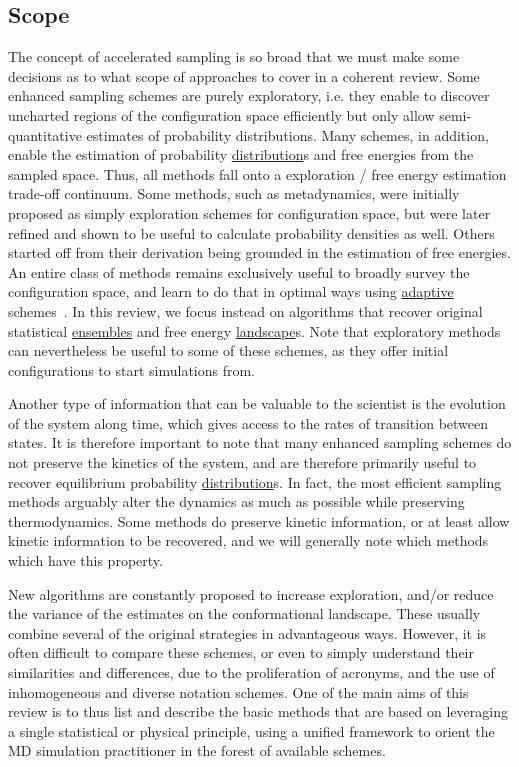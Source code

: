 \documentclass[9pt,review]{livecoms}
\begin{document}
\subsection{Scope}
The concept of accelerated sampling is so broad that we must make some decisions as to what scope of approaches to cover in a coherent review. 
Some enhanced sampling schemes are purely exploratory, i.e. they enable to discover uncharted regions of the configuration space efficiently but only allow semi-quantitative estimates of probability distributions. Many schemes, in addition, enable the estimation of probability \hyperlink{ref:Distribution} {distribution}s and free energies from the sampled space. Thus, all methods fall onto a exploration / free energy estimation trade-off continuum. Some methods, such as metadynamics, were initially proposed as simply exploration schemes for configuration space, but were later refined and shown to be useful to calculate probability densities as well.  Others started off from their derivation being grounded in the estimation of free energies. An entire class of methods remains exclusively useful to broadly survey the configuration space, and learn to do that in optimal ways using \hyperlink{ref:Adaptive} {adaptive} schemes~\cite{ChiavazzoE5494}. In this review, we focus instead on algorithms that recover original statistical \hyperlink{ref:Ensemble} {ensembles} and free energy \hyperlink{ref:FES} {landscape}s. Note that exploratory methods can nevertheless be useful to some of these schemes, as they offer initial configurations to start simulations from.

Another type of information that can be valuable to the scientist is the evolution of the system along time, which gives access to the rates of transition between states. It is therefore important to note that many enhanced sampling schemes do not preserve the kinetics of the system, and are therefore primarily useful to recover equilibrium probability \hyperlink{ref:Distribution} {distribution}s. In fact, the most efficient sampling methods arguably alter the dynamics as much as possible while preserving thermodynamics. Some methods do preserve kinetic information, or at least allow kinetic information to be recovered, and we will generally note which methods which have this property.

New algorithms are constantly proposed to increase exploration, and/or reduce the variance of the estimates on the conformational landscape. These usually combine several of the original strategies in advantageous ways. However, it is often difficult to compare these schemes, or even to simply understand their similarities and differences, due to the proliferation of acronyms, and the use of inhomogeneous and diverse notation schemes. One of the main aims of this review is to thus list and describe the basic methods that are based on leveraging a single statistical or physical principle, using a unified framework to orient the MD simulation practitioner in the forest of available schemes.
\end{document}
